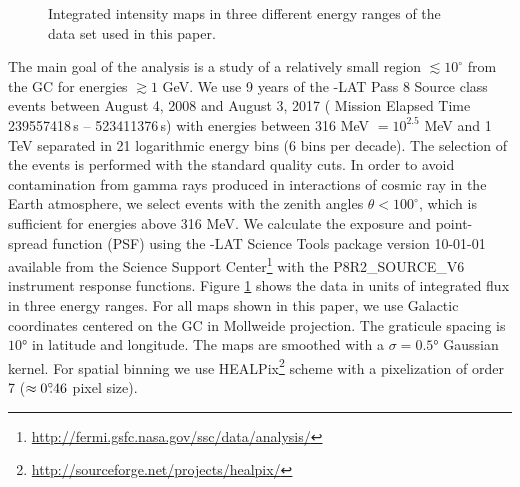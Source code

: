 \begin{figure}[h]
{\begin{subfigure}{0.3\textwidth}
    	\end{subfigure}
    }
  	\caption{Integrated intensity maps in three different energy ranges of the data set used in this paper.}
  	\label{fig:Maps_data}
\end{figure}

The main goal of the analysis is a study of a relatively small region $\lesssim 10^\circ$ from the GC for energies $\gtrsim 1$ GeV.
We use 9 years of the \Fermi-LAT Pass 8 Source class events
between August 4, 2008  and August 3, 2017 ({\Fermi} Mission Elapsed Time 239557418\,s -- 523411376\,s)
with energies between 316 MeV $ = 10^{2.5}$ MeV
and 1 TeV separated in 21 logarithmic energy bins (6 bins per decade).
The selection of the events is performed with the standard quality cuts.
In order to avoid contamination from gamma rays produced in interactions of cosmic ray in the Earth atmosphere, 
we select events with the zenith angles $\theta < 100^{\circ}$,
which is sufficient for energies above 316 MeV.
We calculate the exposure and point-spread function (PSF) using the {\Fermi}-LAT Science Tools package version 
10-01-01 available from the {\Fermi} Science Support Center\footnote{\url{http://fermi.gsfc.nasa.gov/ssc/data/analysis/}} 
with the P8R2\_SOURCE\_V6 instrument response functions.
Figure \ref{fig:Maps_data} shows the data in units of integrated flux in three energy ranges. For all maps shown in this paper, we use Galactic coordinates centered on the GC in Mollweide projection. The graticule spacing is $\ang{10}$ in latitude and longitude. The maps are smoothed with a $\sigma = \ang{0.5}$ Gaussian kernel.
For spatial binning we use HEALPix\footnote{\url{http://sourceforge.net/projects/healpix/}} \citep{2005ApJ...622..759G} scheme with a pixelization of order 7  ($\approx 0^\circ\!\!.46$ pixel size). 

